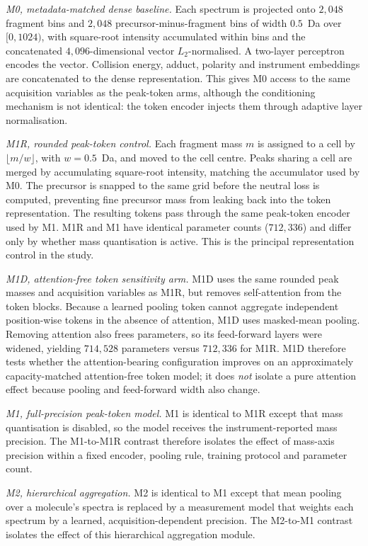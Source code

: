 \documentclass[11pt]{article}
\begin{document}
\emph{M0, metadata-matched dense baseline.} Each spectrum is projected onto $2{,}048$ fragment bins and $2{,}048$ precursor-minus-fragment bins of width $0.5$~Da over $[0,1024)$, with square-root intensity accumulated within bins and the concatenated $4{,}096$-dimensional vector $L_2$-normalised. A two-layer perceptron encodes the vector. Collision energy, adduct, polarity and instrument embeddings are concatenated to the dense representation. This gives M0 access to the same acquisition variables as the peak-token arms, although the conditioning mechanism is not identical: the token encoder injects them through adaptive layer normalisation.

\emph{M1R, rounded peak-token control.} Each fragment mass $m$ is assigned to a cell by $\lfloor m/w \rfloor$, with $w=0.5$~Da, and moved to the cell centre. Peaks sharing a cell are merged by accumulating square-root intensity, matching the accumulator used by M0. The precursor is snapped to the same grid before the neutral loss is computed, preventing fine precursor mass from leaking back into the token representation. The resulting tokens pass through the same peak-token encoder used by M1. M1R and M1 have identical parameter counts ($712{,}336$) and differ only by whether mass quantisation is active. This is the principal representation control in the study.

\emph{M1D, attention-free token sensitivity arm.} M1D uses the same rounded peak masses and acquisition variables as M1R, but removes self-attention from the token blocks. Because a learned pooling token cannot aggregate independent position-wise tokens in the absence of attention, M1D uses masked-mean pooling. Removing attention also frees parameters, so its feed-forward layers were widened, yielding $714{,}528$ parameters versus $712{,}336$ for M1R. M1D therefore tests whether the attention-bearing configuration improves on an approximately capacity-matched attention-free token model; it does \emph{not} isolate a pure attention effect because pooling and feed-forward width also change.

\emph{M1, full-precision peak-token model.} M1 is identical to M1R except that mass quantisation is disabled, so the model receives the instrument-reported mass precision. The M1-to-M1R contrast therefore isolates the effect of mass-axis precision within a fixed encoder, pooling rule, training protocol and parameter count.

\emph{M2, hierarchical aggregation.} M2 is identical to M1 except that mean pooling over a molecule's spectra is replaced by a measurement model that weights each spectrum by a learned, acquisition-dependent precision. The M2-to-M1 contrast isolates the effect of this hierarchical aggregation module.
\end{document}

